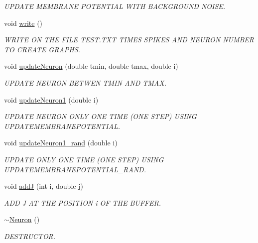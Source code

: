 \begin{DoxyCompactItemize}
\begin{DoxyCompactList}\small\item\em U\-P\-D\-A\-T\-E M\-E\-M\-B\-R\-A\-N\-E P\-O\-T\-E\-N\-T\-I\-A\-L W\-I\-T\-H B\-A\-C\-K\-G\-R\-O\-U\-N\-D N\-O\-I\-S\-E. \end{DoxyCompactList}\item 
void \hyperlink{classNeuron_a1e11638d1b93fc89412c1b1cdaa3a866}{write} ()
\begin{DoxyCompactList}\small\item\em W\-R\-I\-T\-E O\-N T\-H\-E F\-I\-L\-E T\-E\-S\-T.\-T\-X\-T T\-I\-M\-E\-S S\-P\-I\-K\-E\-S A\-N\-D N\-E\-U\-R\-O\-N N\-U\-M\-B\-E\-R T\-O C\-R\-E\-A\-T\-E G\-R\-A\-P\-H\-S. \end{DoxyCompactList}\item 
void \hyperlink{classNeuron_a7a67992e7dd7e86861e5d6e7b3faf0d3}{update\-Neuron} (double tmin, double tmax, double i)
\begin{DoxyCompactList}\small\item\em U\-P\-D\-A\-T\-E N\-E\-U\-R\-O\-N B\-E\-T\-W\-E\-N T\-M\-I\-N A\-N\-D T\-M\-A\-X. \end{DoxyCompactList}\item 
void \hyperlink{classNeuron_a8c07fddc918b661b2f5112724cfe8e42}{update\-Neuron1} (double i)
\begin{DoxyCompactList}\small\item\em U\-P\-D\-A\-T\-E N\-E\-U\-R\-O\-N O\-N\-L\-Y O\-N\-E T\-I\-M\-E (O\-N\-E S\-T\-E\-P) U\-S\-I\-N\-G U\-P\-D\-A\-T\-E\-M\-E\-M\-B\-R\-A\-N\-E\-P\-O\-T\-E\-N\-T\-I\-A\-L. \end{DoxyCompactList}\item 
void \hyperlink{classNeuron_a2fffb8841ea5cb1cebf214b488884a22}{update\-Neuron1\-\_\-rand} (double i)
\begin{DoxyCompactList}\small\item\em U\-P\-D\-A\-T\-E O\-N\-L\-Y O\-N\-E T\-I\-M\-E (O\-N\-E S\-T\-E\-P) U\-S\-I\-N\-G U\-P\-D\-A\-T\-E\-M\-E\-M\-B\-R\-A\-N\-E\-P\-O\-T\-E\-N\-T\-I\-A\-L\-\_\-\-R\-A\-N\-D. \end{DoxyCompactList}\item 
void \hyperlink{classNeuron_a424cb8a700631171063a0899fb6c6df5}{add\-J} (int i, double j)
\begin{DoxyCompactList}\small\item\em A\-D\-D J A\-T T\-H\-E P\-O\-S\-I\-T\-I\-O\-N i O\-F T\-H\-E B\-U\-F\-F\-E\-R. \end{DoxyCompactList}\item 
\hypertarget{classNeuron_a94a250ce7e167760e593979b899745b1}{\hyperlink{classNeuron_a94a250ce7e167760e593979b899745b1}{$\sim$\-Neuron} ()}\label{classNeuron_a94a250ce7e167760e593979b899745b1}

\begin{DoxyCompactList}\small\item\em D\-E\-S\-T\-R\-U\-C\-T\-O\-R. \end{DoxyCompactList}\end{DoxyCompactItemize}


